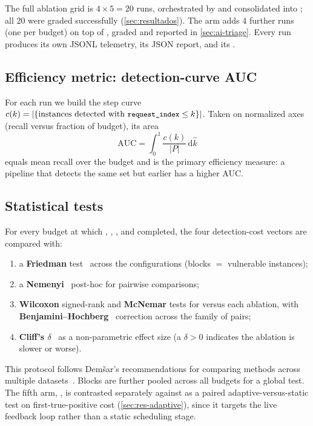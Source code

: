 The full ablation grid is $4 \times 5 = 20$ runs, orchestrated by
 and consolidated into
; all \num{20} were graded successfully
(\cref{sec:resultados}). The  arm adds \num{4} further runs
(one per budget) on top of , graded and reported in
\cref{sec:ai-triage}. Every run produces its own JSONL telemetry, its JSON
report, and its .

\subsection{Efficiency metric: detection-curve AUC}
\label{sec:auc}

For each run we build the step curve
$c(k) = \lvert \{\text{instances detected with } \texttt{\small request\_index} \le k\} \rvert$.
Taken on normalized axes (recall versus fraction of budget), its area
\begin{equation}
  \mathrm{AUC} = \int_0^1 \frac{c(k)}{\lvert P \rvert}\, \mathrm{d}\hat{k}
  \label{eq:auc}
\end{equation}
equals mean recall over the budget and is the primary efficiency measure: a
pipeline that detects the same set but earlier has a higher AUC.

\subsection{Statistical tests}
\label{sec:tests}

For every budget at which , ,
, and  completed, the four
detection-cost vectors are compared with:
\begin{enumerate}
  \item a \textbf{Friedman} test~\cite{friedman1937use} across the
  configurations (blocks $=$ vulnerable instances);
  \item a \textbf{Nemenyi}~\cite{nemenyi1963distribution} post-hoc for
  pairwise comparisons;
  \item \textbf{Wilcoxon} signed-rank and \textbf{McNemar} tests for
   versus each ablation, with
  \textbf{Benjamini--Hochberg}~\cite{benjamini1995controlling} correction
  across the family of pairs;
  \item \textbf{Cliff's $\delta$}~\cite{cliff1993dominance} as a
  non-parametric effect size (a $\delta > 0$ indicates the ablation is slower
  or worse).
\end{enumerate}
This protocol follows Dem\v{s}ar's recommendations for comparing methods
across multiple datasets~\cite{demsar2006statistical}. Blocks are further
pooled across all budgets for a global test. The fifth arm,
, is contrasted separately against 
as a paired adaptive-versus-static test on first-true-positive cost
(\cref{sec:res-adaptive}), since it targets the live feedback loop rather
than a static scheduling stage.

